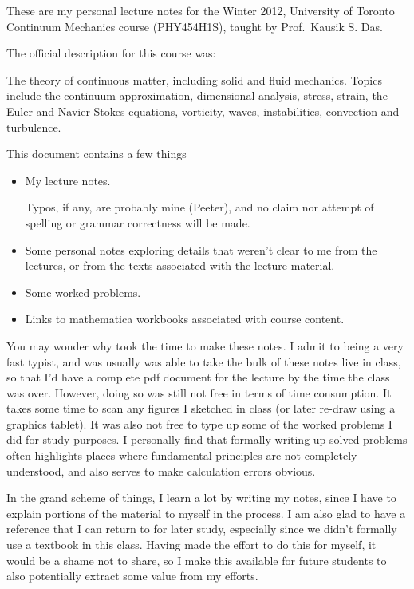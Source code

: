 
These are my personal lecture notes for the Winter 2012, University of Toronto Continuum Mechanics course (PHY454H1S), taught by Prof.\ Kausik S. Das.

The official description for this course was:

The theory of continuous matter, including solid and fluid mechanics.  Topics include the continuum approximation, dimensional analysis, stress, strain, the Euler and Navier-Stokes equations, vorticity, waves, instabilities, convection and turbulence.

This document contains a few things

\begin{itemize}
\item My lecture notes.

Typos, if any, are probably mine (Peeter), and no claim nor attempt of spelling or grammar correctness will be made.

\item Some personal notes exploring details that weren't clear to me from the lectures, or from the texts associated with the lecture material.

\item Some worked problems.

\item Links to mathematica workbooks associated with course content.

\end{itemize}

You may wonder why took the time to make these notes.  I admit to being a very fast typist, and was usually was able to take the bulk of these notes live in class, so that I'd have a complete pdf document for the lecture by the time the class was over.  However, doing so was still not free in terms of time consumption.  It takes some time to scan any figures I sketched in class (or later re-draw using a graphics tablet).  It was also not free to type up some of the worked problems I did for study purposes.  I personally find that formally writing up solved problems often highlights places where fundamental principles are not completely understood, and also serves to make calculation errors obvious.

In the grand scheme of things, I learn a lot by writing my notes, since I have to explain portions of the material to myself in the process.  I am also glad to have a reference that I can return to for later study, especially since we didn't formally use a textbook in this class.  Having made the effort to do this for myself, it would be a shame not to share, so I make this available for future students to also potentially extract some value from my efforts.


